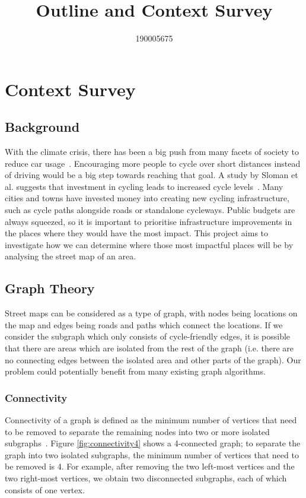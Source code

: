 \documentclass[12pt,a4paper]{report}
\title{Outline and Context Survey}
\author{190005675}
\date{}
\begin{document}
\maketitle
\newpage



\chapter*{Context Survey}
\section*{Background}
With the climate crisis, there has been a big push from many facets of society to reduce car usage~\cite{CHAPMAN2007354}. Encouraging more people to cycle over short distances instead of driving would be a big step towards reaching that goal. A study by Sloman et al. suggests that investment in cycling leads to increased cycle levels~\cite{Sloman2009}. Many cities and towns have invested money into creating new cycling infrastructure, such as cycle paths alongside roads or standalone cycleways. Public budgets are always squeezed, so it is important to prioritise infrastructure improvements in the places where they would have the most impact. This project aims to investigate how we can determine where those most impactful places will be by analysing the street map of an area.

\section*{Graph Theory}
Street maps can be considered as a type of graph, with nodes being locations on the map and edges being roads and paths which connect the locations. If we consider the subgraph which only consists of cycle-friendly edges, it is possible that there are areas which are isolated from the rest of the graph (i.e. there are no connecting edges between the isolated area and other parts of the graph). Our problem could potentially benefit from many existing graph algorithms.

\subsection*{Connectivity}
Connectivity of a graph is defined as the minimum number of vertices that need to be removed to separate the remaining nodes into two or more isolated subgraphs~\cite{citeulike:395714}. Figure \ref{fig:connectivity4} shows a 4-connected graph; to separate the graph into two isolated subgraphs, the minimum number of vertices that need to be removed is 4. For example, after removing the two left-most vertices and the two right-most vertices, we obtain two disconnected subgraphs, each of which consists of one vertex. 
\end{document}
